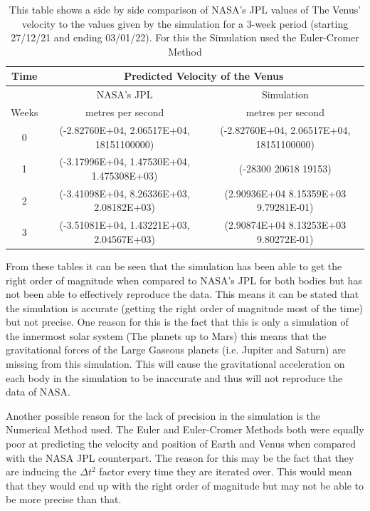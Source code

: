 \documentclass[a4paper,10pt]{article}
\begin{document}
\begin{table}[htp!]
\begin{center}
\begin{tabular}{|c|c|c|}
\hline 
Time & \multicolumn{2}{|c|}{Predicted Velocity of the Venus} \\
\hline
  & NASA's JPL & Simulation \\
Weeks & metres per second & metres per second\\
\hline
   0 & (-2.82760E+04, 2.06517E+04, 18151100000) & (-2.82760E+04, 2.06517E+04, 18151100000)  \\ 
   1 & (-3.17996E+04, 1.47530E+04, 1.475308E+03) & (-28300  20618  19153)  \\
   2 & (-3.41098E+04, 8.26336E+03, 2.08182E+03) & (2.90936E+04 8.15359E+03 9.79281E-01)   \\
   3 & (-3.51081E+04, 1.43221E+03, 2.04567E+03) & (2.90874E+04 8.13253E+03 9.80272E-01)   \\
\hline 
\end{tabular}
\end{center}
\caption{\label{table:Magnitude of Conserved Quantities} This table shows a side by side comparison of NASA's JPL values of The Venus' velocity to the values given by the simulation for a 3-week period (starting 27/12/21 and ending 03/01/22). For this the Simulation used the Euler-Cromer Method}
\end{table}

From these tables it can be seen that the simulation has been able to get the right order of magnitude when compared to NASA's JPL for both bodies but has not been able to effectively reproduce the data. This means it can be stated that the simulation is accurate (getting the right order of magnitude most of the time) but not precise. One reason for this is the fact that this is only a simulation of the innermost solar system (The planets up to Mars) this means that the gravitational forces of the Large Gaseous planets (i.e. Jupiter and Saturn) are missing from this simulation. This will cause the gravitational acceleration on each body in the simulation to be inaccurate and thus will not reproduce the data of NASA.

Another possible reason for the lack of precision in the simulation is the Numerical Method used. The Euler and Euler-Cromer Methods both were equally poor at predicting the velocity and position of Earth and Venus  when compared with the NASA JPL counterpart. The reason for this may be the fact that they are inducing the $\Delta t^{2}$ factor every time they are iterated over. This would mean that they would end up with the right order of magnitude but may not be able to be more precise than that.
\end{document}
